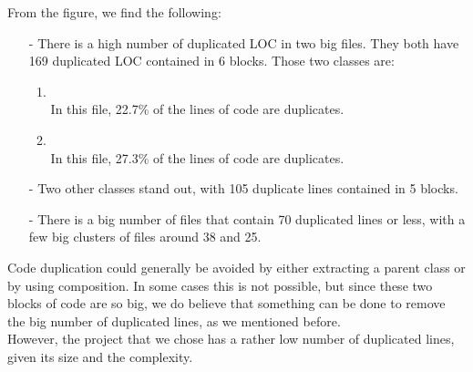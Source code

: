             From the figure, we find the following: 
            \begin{itemize}
                \item[-] There is a high number of duplicated LOC in two big files. They both have 169 duplicated LOC contained in 6 blocks. Those two classes are: 
                \begin{enumerate}
                    \item {}\\
                    In this file, 22.7\% of the lines of code are duplicates. 
                    \item {}\\
                     In this file, 27.3\% of the lines of code are duplicates. 
                \end{enumerate}
                \item[-] Two other classes stand out, with 105 duplicate lines contained in 5 blocks. 
                \item[-] There is a big number of files that contain 70 duplicated lines or less, with a few big clusters of files around 38 and 25. 
 
            \end{itemize}
            Code duplication could generally be avoided by either extracting a parent class or by using composition. In some cases this is not possible, but since these two blocks of code are so big, we do believe that something can be done to remove the big number of duplicated lines, as we mentioned before. \\
            However, the project that we chose has a rather low number of duplicated lines, given its size and the complexity.
         
